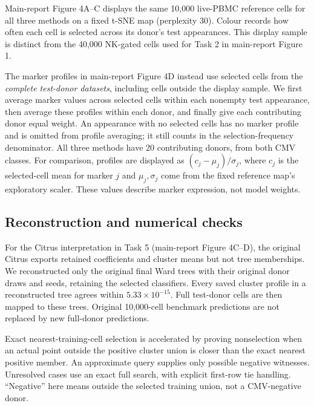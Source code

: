 \documentclass[11pt,a4paper]{article}
\begin{document}
Main-report Figure 4A--C displays the same 10,000 live-PBMC reference cells for all three methods on a fixed t-SNE map (perplexity 30). Colour records how often each cell is selected across its donor's test appearances. This display sample is distinct from the 40,000 NK-gated cells used for Task 2 in main-report Figure 1.

The marker profiles in main-report Figure 4D instead use selected cells from the \emph{complete test-donor datasets}, including cells outside the display sample. We first average marker values across selected cells within each nonempty test appearance, then average these profiles within each donor, and finally give each contributing donor equal weight. An appearance with no selected cells has no marker profile and is omitted from profile averaging; it still counts in the selection-frequency denominator. All three methods have 20 contributing donors, from both CMV classes. For comparison, profiles are displayed as $(c_j-\mu_j)/\sigma_j$, where $c_j$ is the selected-cell mean for marker $j$ and $\mu_j,\sigma_j$ come from the fixed reference map's exploratory scaler. These values describe marker expression, not model weights.

\subsection{Reconstruction and numerical checks}
For the Citrus interpretation in Task 5 (main-report Figure 4C--D), the original Citrus exports retained coefficients and cluster means but not tree memberships. We reconstructed only the original final Ward trees with their original donor draws and seeds, retaining the selected classifiers. Every saved cluster profile in a reconstructed tree agrees within $5.33\times10^{-15}$. Full test-donor cells are then mapped to these trees. Original 10,000-cell benchmark predictions are not replaced by new full-donor predictions.

Exact nearest-training-cell selection is accelerated by proving nonselection when an actual point outside the positive cluster union is closer than the exact nearest positive member. An approximate query supplies only possible negative witnesses. Unresolved cases use an exact full search, with explicit first-row tie handling. ``Negative'' here means outside the selected training union, not a CMV-negative donor.
\end{document}
